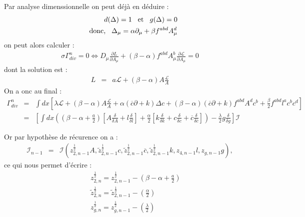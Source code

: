 \documentclass[a4paper,11pt]{article}
\theoremstyle{plain}
\theoremstyle{definition}
\theoremstyle{remark}
\numberwithin{equation}{section}
\numberwithin{equation}{subsection}
\numberwithin{figure}{section}
\begin{document}
Par analyse dimenssionnelle on peut déjà en déduire :
\begin{eqnarray}
 && d(\Delta) = 1 \hspace{3mm} \text{et} \hspace{3mm}  g(\Delta) = 0 \\
 && \text{donc,} \hspace{3mm} \Delta_{\mu} = \alpha \partial_{\mu} +\beta f^{abd} A^{d}_{\mu}
\end{eqnarray}
on peut alors calculer :
\begin{eqnarray}
 \sigma \Gamma^{n}_{div} = 0 \Leftrightarrow  
D_{\mu} \frac{\partial L}{\partial A_{\mu}} + (\beta-\alpha) f^{abd} A^{b}_{\mu}  \frac{\partial \mathcal{L}}{\partial A_{\mu}} = 0
\end{eqnarray}
dont la solution est :
\begin{eqnarray}
 L &=& a \mathcal{L} + (\beta - \alpha) A \frac{\mathcal{L}}{A}
\end{eqnarray}
On a onc au final :
\begin{eqnarray}
 \Gamma^{n}_{div} &=& \int dx \left[  \lambda \mathcal{L} + (\beta - \alpha) A \frac{\mathcal{L}}{A} 
+ \alpha ( \overline{c}  \partial + k) \Delta c + (\beta - \alpha) ( \overline{c}  \partial + k)f^{abd} A^{d}c^b 
+ \frac{\beta}{2} f^{abd} l^{a}c^{b}c^{d} \right] \nonumber \\
                  &=& \left[ \int dx \left( ( \beta - \alpha + \frac{a}{2}) \left[A \frac{\delta}{\delta A} 
+ l \frac{\delta}{\delta l} \right] + \frac{\alpha}{2} \left[k \frac{\delta}{\delta k} + c \frac{\delta}{\delta c} 
+ \overline{c} \frac{\delta}{\delta  \overline{c} } \right]  \right) - \frac{\lambda}{2} g \frac{\delta}{\delta g}    \right] \mathcal{I}
\end{eqnarray}

\noindent
Or par hypothèse de récurence on a : 
\begin{eqnarray}
 \mathcal{I}_{n-1} &=& \mathcal{I} \left( z_{2,n-1}^{\frac{1}{2}}A , \tilde{z}^{\frac{1}{2}}_{2,n-1}c, 
\tilde{z}^{\frac{1}{2}}_{2,n-1} \overline{c} , \tilde{z}^{\frac{1}{2}}_{2,n-1}k , z_{4,n-1} l, z_{g,n-1} g  \right),
\end{eqnarray}
ce qui nous permet d'écrire :
\begin{eqnarray}
 && z_{2,n}^{\frac{1}{2}} = z_{2,n-1}^{\frac{1}{2}} - \left( \beta - \alpha + \frac{a}{2} \right)\\
 && \tilde{z}_{2,n}^{\frac{1}{2}} = \tilde{z}_{2,n-1}^{\frac{1}{2}} - \left( \frac{\alpha}{2}\right) \\
 && z_{g,n}^{\frac{1}{2}} = z_{g,n-1}^{\frac{1}{2}} - \left( \frac{\lambda}{2}\right)
\end{eqnarray}
\end{document}
